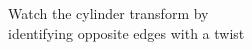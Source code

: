 \documentclass[preview]{standalone}
\begin{document}
\begin{center}
Watch the cylinder transform by\\identifying opposite edges with a twist
\end{center}
\end{document}
